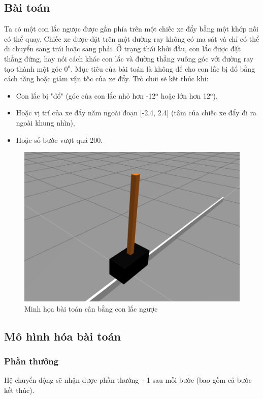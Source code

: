 \documentclass[12pt,a4paper]{report}
\begin{document}
\subsection{Bài toán}
Ta có một con lắc ngược được gắn phía trên một chiếc xe đẩy bằng một khớp nối có thể
quay. Chiếc xe được đặt trên một đường ray không có ma sát và chỉ có thể di chuyển sang
trái hoặc sang phải. Ở trạng thái khởi đầu, con lắc được đặt thẳng đứng, hay nói cách khác
con lắc và đường thẳng vuông góc với đường ray tạo thành một góc $0^\text{o}$. Mục tiêu của bài toán
là không để cho con lắc bị đổ bằng cách tăng hoặc giảm vận tốc của xe đẩy. Trò chơi sẽ kết
thúc khi:
\begin{itemize}
	\item Con lắc bị "đổ" (góc của con lắc nhỏ hơn -12$^\text{o}$ hoặc lớn hơn 12$^\text{o}$),
	\item Hoặc vị trí của xe đẩy năm ngoài đoạn [-2.4, 2.4] (tâm của chiếc xe đẩy đi ra ngoài
	khung nhìn),
	\item Hoặc số bước vượt quá 200.
\end{itemize}
\begin{figure}
	\centering
	\includegraphics[scale=.6]{8}
	\caption{Minh họa bài toán cân bằng con lắc ngược}
\end{figure}
\subsection{Mô hình hóa bài toán}
\subsubsection{Phần thưởng}
Hệ chuyển động sẽ nhận được phần thưởng +1 sau mỗi bước (bao gồm cả bước kết thúc).
\end{document}
